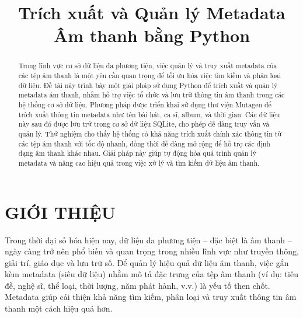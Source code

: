 \documentclass[conference]{IEEEtran}
\begin{document}
\title{Trích xuất và Quản lý Metadata Âm thanh bằng Python}

\author{
}

\maketitle

\begin{abstract}
Trong lĩnh vực cơ sở dữ liệu đa phương tiện, việc quản lý và truy xuất metadata của các tệp âm thanh là một yêu cầu quan trọng để tối ưu hóa việc tìm kiếm và phân loại dữ liệu. Đề tài này trình bày một giải pháp sử dụng Python để trích xuất và quản lý metadata âm thanh, nhằm hỗ trợ việc tổ chức và lưu trữ thông tin âm thanh trong các hệ thống cơ sở dữ liệu. Phương pháp được triển khai sử dụng thư viện Mutagen để trích xuất thông tin metadata như tên bài hát, ca sĩ, album, và thời gian. Các dữ liệu này sau đó được lưu trữ trong cơ sở dữ liệu SQLite, cho phép dễ dàng truy vấn và quản lý. Thử nghiệm cho thấy hệ thống có khả năng trích xuất chính xác thông tin từ các tệp âm thanh với tốc độ nhanh, đồng thời dễ dàng mở rộng để hỗ trợ các định dạng âm thanh khác nhau. Giải pháp này giúp tự động hóa quá trình quản lý metadata và nâng cao hiệu quả trong việc xử lý và tìm kiếm dữ liệu âm thanh.
\end{abstract}


\section{GIỚI THIỆU}
Trong thời đại số hóa hiện nay, dữ liệu đa phương tiện – đặc biệt là âm thanh – ngày càng trở nên phổ biến và quan trọng trong nhiều lĩnh vực như truyền thông, giải trí, giáo dục và lưu trữ số. Để quản lý hiệu quả dữ liệu âm thanh, việc gắn kèm metadata (siêu dữ liệu) nhằm mô tả đặc trưng của tệp âm thanh (ví dụ: tiêu đề, nghệ sĩ, thể loại, thời lượng, năm phát hành, v.v.) là yếu tố then chốt. Metadata giúp cải thiện khả năng tìm kiếm, phân loại và truy xuất thông tin âm thanh một cách hiệu quả hơn.
\end{document}
